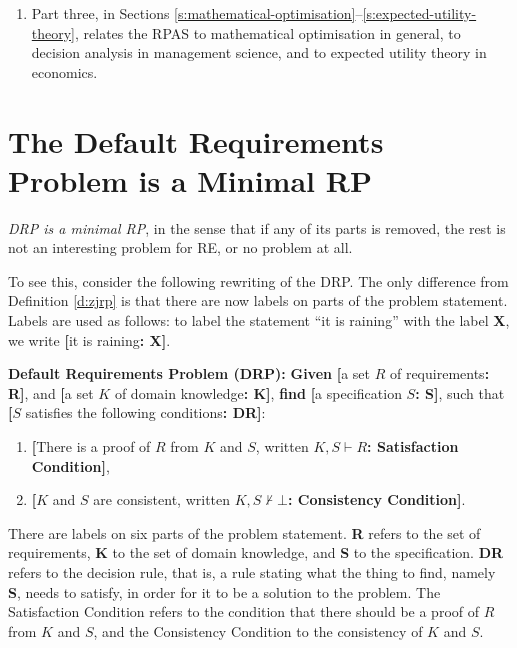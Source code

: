 \documentclass[graybox]{svmult}
\newcommand{\zi}[1]{\textit{#1}}
\newcommand{\xb}[1]{\textbf{#1}}
\newcommand{\RE}{RE}
\newcommand{\RPfull}{Requirements Problem}
\newcommand{\RP}{RP}
\newcommand{\RPAS}{RPAS}
\newcommand{\ZJRPfull}{Default \RPfull}
\newcommand{\ZJRP}{DRP}
\newcommand{\SatisfactionCondition}{Satisfaction Condition}
\newcommand{\ConsistencyCondition}{Consistency Condition}
\newcommand{\ROPfull}{Requirements Optimisation Problem}
\newcommand{\CLabel}[2]{\xb{[}#1\xb{: #2]}}
\begin{document}
\begin{enumerate}
{\begin{enumerate}
        \item{Section \ref{s:optimal-specifications} connects the discussion of optimality to the new concepts introduced in Section \ref{s:spaces}.}
        \item{Section \ref{s:rop} introduces a new class of \RP s, called \ROPfull s, used to define the \RPAS.}
        \item{Section \ref{s:rpas} defines the \RPAS.}
    \end{enumerate}
    }
    \item{Part three, in Sections \ref{s:mathematical-optimisation}--\ref{s:expected-utility-theory}, relates the \RPAS{} to mathematical optimisation in general, to decision analysis in management science, and to expected utility theory in economics.
    }
\end{enumerate}



%
\section{The \ZJRPfull{} is a Minimal \RP}\label{s:minimality}
\zi{\ZJRP{} is a minimal \RP}, in the sense that if any of its parts is removed, the rest is not an interesting problem for \RE, or no problem at all. 

To see this, consider the following rewriting of the \ZJRP. The only difference from Definition \ref{d:zjrp} is that there are now labels on parts of the problem statement. Labels are used as follows: to label the statement ``it is raining'' with the label \xb{X}, we write \CLabel{it is raining}{X}.

\begin{definition}\label{d:zjrp:labeled}
\xb{\ZJRPfull{} (\ZJRP):} \xb{Given} \CLabel{a set $R$ of requirements}{R}, and \CLabel{a set $K$ of domain knowledge}{K}, \xb{find} \CLabel{a specification $S$}{S}, such that \CLabel{$S$ satisfies the following conditions}{DR}:
\begin{enumerate}
    \item{\CLabel{There is a proof of $R$ from $K$ and $S$, written $K, S \vdash R$}{\SatisfactionCondition},}
    \item{\CLabel{$K$ and $S$ are consistent, written $K, S \not\vdash \bot$}{\ConsistencyCondition}.}
\end{enumerate}
\end{definition}

There are labels on six parts of the problem statement. \xb{R} refers to the set of requirements, \xb{K} to the set of domain knowledge, and \xb{S} to the specification. \xb{DR} refers to the decision rule, that is, a rule stating what the thing to find, namely \xb{S}, needs to satisfy, in order for it to be a solution to the problem. The \SatisfactionCondition{} refers to the condition that there should be a proof of $R$ from $K$ and $S$, and the \ConsistencyCondition{} to the consistency of $K$ and $S$.
\end{document}
